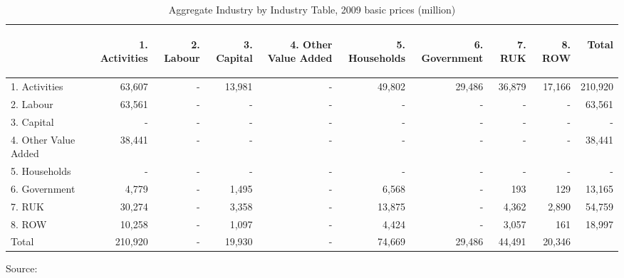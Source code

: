   \begin{table}[H] \caption{Aggregate Industry by Industry Table, 2009 basic prices (\textsterling million)}
  \bigskip \begin{scriptsize} \begin{centering} \begin{doublespacing}
  \begin{tabular}{lrrrrrrrrr}
  \toprule
  & \begin{sideways}1. Activities \end{sideways} &
  \begin{sideways}2. Labour \end{sideways} &
  \begin{sideways}3. Capital \end{sideways} &
  \begin{sideways}4. Other Value Added \end{sideways} &
  \begin{sideways}5. Households \end{sideways} &
  \begin{sideways}6. Government \end{sideways} &
  \begin{sideways}7. RUK  \end{sideways} &
  \begin{sideways}8. ROW  \end{sideways} &
  \begin{sideways}Total \end{sideways}  \bigstrut[b]\\
  \hline
  1. Activities &  63,607  & \: \: \: \: \: -  &  13,981  &  \: \: \: \: \: -  &  49,802  &  29,486  &  36,879  &  17,166  &  210,920  \\
  2. Labour &  63,561  &  -  &  -  &  -  &  -  &  -  &  -  &  -  &  63,561  \\
  3. Capital &  -  &  -  &  -  &  -  &  -  &  -  &  -  &  -  &  -  \\
  4. Other Value Added &  38,441  &  -  &  -  &  -  &  -  &  -  &  -  &  -  &  38,441  \\
  5. Households &  -  &  -  &  -  &  -  &  -  &  -  &  -  &  -  &  -  \\
  6. Government &    4,779  &  -  &  1,495  &  -  &  6,568  &  -  &      193  &      129  &  13,165  \\
  7. RUK &  30,274  &  -  &  3,358  &  -  &  13,875  &  -  &  4,362  &  2,890  &  54,759  \\
  8. ROW &  10,258  &  -  &  1,097  &  -  &  4,424  &  -  &  3,057  &      161  &  18,997   \bigstrut[b]\\
  \hline
  Total &  210,920  &  -  &  19,930  &  -  &  74,669  &  29,486  &  44,491  &  20,346  &   \bigstrut[t]\\
      \bottomrule \end{tabular}%
      \bigskip \begin{flushright}Source:  \end{flushright} \label{tab:2.3.1}
      \end{doublespacing} \end{centering} \end{scriptsize} \end{table}


